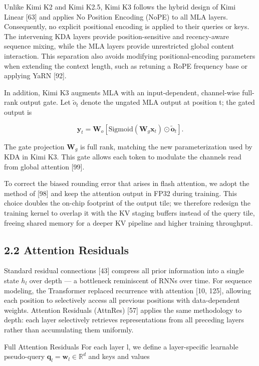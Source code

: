 \documentclass[
  10
]{article}
\begin{document}
Unlike Kimi K2 and Kimi K2.5, Kimi K3 follows the hybrid design of Kimi
Linear {[}63{]} and applies No Position Encoding (NoPE) to all MLA
layers. Consequently, no explicit positional encoding is applied to
their queries or keys. The intervening KDA layers provide
position-sensitive and recency-aware sequence mixing, while the MLA
layers provide unrestricted global content interaction. This separation
also avoids modifying positional-encoding parameters when extending the
context length, such as retuning a RoPE frequency base or applying YaRN
{[}92{]}.

In addition, Kimi K3 augments MLA with an input-dependent, channel-wise
full-rank output gate. Let \({ \tilde { o } } _ { t }\) denote the
ungated MLA output at position t; the gated output is

\[
\boldsymbol {y} _ {t} = \mathbf {W} _ {o} [ \text {Sigmoid} (\mathbf {W} _ {g} \boldsymbol {x} _ {t}) \odot \tilde {\boldsymbol {o}} _ {t} ]  .\tag{7}
\]

The gate projection \(\mathbf { W } _ { g }\) is full rank, matching the
new parameterization used by KDA in Kimi K3. This gate allows each token
to modulate the channels read from global attention {[}99{]}.

To correct the biased rounding error that arises in flash attention, we
adopt the method of {[}98{]} and keep the attention output in FP32
during training. This choice doubles the on-chip footprint of the output
tile; we therefore redesign the training kernel to overlap it with the
KV staging buffers instead of the query tile, freeing shared memory for
a deeper KV pipeline and higher training throughput.

\subsection{2.2 Attention Residuals}\label{attention-residuals}

Standard residual connections {[}43{]} compress all prior information
into a single state \(h _ { l }\) over depth --- a bottleneck
reminiscent of RNNs over time. For sequence modeling, the Transformer
replaced recurrence with attention {[}10, 125{]}, allowing each position
to selectively access all previous positions with data-dependent
weights. Attention Residuals (AttnRes) {[}57{]} applies the same
methodology to depth: each layer selectively retrieves representations
from all preceding layers rather than accumulating them uniformly.

Full Attention Residuals For each layer l, we define a layer-specific
learnable pseudo-query
\(\pmb q _ { l } = \pmb w _ { l } \in \mathbb { R } ^ { d }\) and keys
and values
\end{document}

